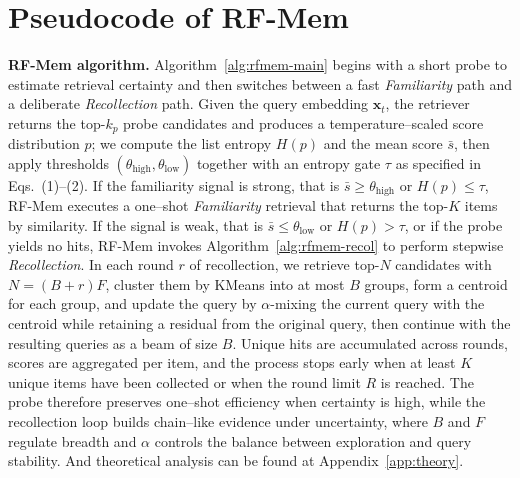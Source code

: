\section{Pseudocode of RF-Mem}
\label{app:pse_code}

\noindent\textbf{RF-Mem algorithm.} Algorithm~\ref{alg:rfmem-main} begins with a short probe to estimate retrieval certainty and then switches between a fast \emph{Familiarity} path and a deliberate \emph{Recollection} path. Given the query embedding $\mathbf{x}_t$, the retriever returns the top-$k_p$ probe candidates and produces a temperature–scaled score distribution $p$; we compute the list entropy $H(p)$ and the mean score $\bar{s}$, then apply thresholds $(\theta_{\text{high}},\theta_{\text{low}})$ together with an entropy gate $\tau$ as specified in Eqs.~(1)–(2). If the familiarity signal is strong, that is $\bar{s}\ge\theta_{\text{high}}$ or $H(p)\le\tau$, RF-Mem executes a one–shot \emph{Familiarity} retrieval that returns the top-$K$ items by similarity. 
If the signal is weak, that is $\bar{s}\le\theta_{\text{low}}$ or $H(p)>\tau$, or if the probe yields no hits, RF-Mem invokes Algorithm~\ref{alg:rfmem-recol} to perform stepwise \emph{Recollection}.
In each round $r$ of recollection, we retrieve top-$N$ candidates with $N=(B+r)F$, cluster them by KMeans into at most $B$ groups, form a centroid for each group, and update the query by $\alpha$-mixing the current query with the centroid while retaining a residual from the original query, then continue with the resulting queries as a beam of size $B$. 
Unique hits are accumulated across rounds, scores are aggregated per item, and the process stops early when at least $K$ unique items have been collected or when the round limit $R$ is reached. 
The probe therefore preserves one–shot efficiency when certainty is high, while the recollection loop builds chain–like evidence under uncertainty, where $B$ and $F$ regulate breadth and $\alpha$ controls the balance between exploration and query stability. 
And theoretical analysis can be found at Appendix~\ref{app:theory}.


